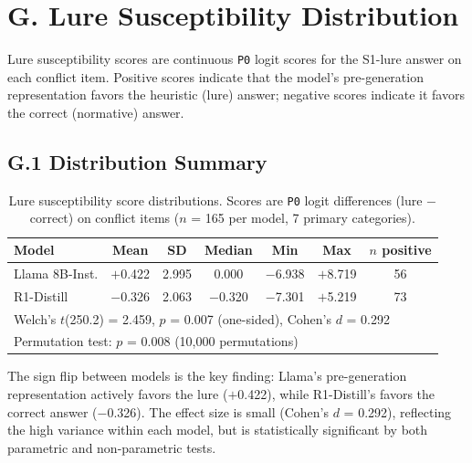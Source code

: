 \documentclass[accepted]{article}
\newcommand{\pzero}{\texttt{P0}}
\begin{document}

\section*{G. Lure Susceptibility Distribution}
\label{sec:appendix_lure}

Lure susceptibility scores are continuous \pzero{} logit scores for
the S1-lure answer on each conflict item.  Positive scores indicate
that the model's pre-generation representation favors the heuristic
(lure) answer; negative scores indicate it favors the correct
(normative) answer.

\subsection*{G.1 Distribution Summary}

\begin{table}[ht]
\centering
\caption{Lure susceptibility score distributions.  Scores are
  \pzero{} logit differences (lure $-$ correct) on conflict items
  ($n$ = 165 per model, 7 primary categories).}
\label{tab:lure_dist}
\vspace{4pt}
\small
\begin{tabular}{lcccccc}
\toprule
\textbf{Model} & \textbf{Mean} & \textbf{SD} & \textbf{Median} &
  \textbf{Min} & \textbf{Max} & \textbf{$n$ positive} \\
\midrule
Llama 8B-Inst.   & $+$0.422 & 2.995 & 0.000 & $-$6.938 & $+$8.719 & 56 \\
R1-Distill       & $-$0.326 & 2.063 & $-$0.320 & $-$7.301 & $+$5.219 & 73 \\
\midrule
\multicolumn{7}{l}{Welch's $t$(250.2) = 2.459, $p$ = 0.007 (one-sided), Cohen's $d$ = 0.292} \\
\multicolumn{7}{l}{Permutation test: $p$ = 0.008 (10{,}000 permutations)} \\
\bottomrule
\end{tabular}
\end{table}

\noindent The sign flip between models is the key finding: Llama's
pre-generation representation actively favors the lure ($+$0.422),
while R1-Distill's favors the correct answer ($-$0.326).  The effect
size is small (Cohen's $d$ = 0.292), reflecting the high variance
within each model, but is statistically significant by both
parametric and non-parametric tests.
\end{document}
